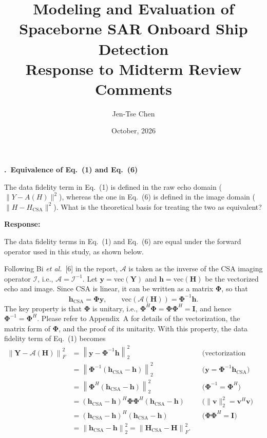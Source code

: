 \documentclass[12pt]{article}
\title{Modeling and Evaluation of Spaceborne SAR Onboard Ship Detection\\
       Response to Midterm Review Comments}
\author{Jen-Tse Chen}
\date{October, 2026}
\newcounter{comment}
\newcommand{\comment}[2]{%
  \refstepcounter{comment}%
  \par\bigskip\noindent\textbf{\thecomment.\ #1}\par\smallskip
  \noindent #2\par\medskip
}
\newcommand{\response}{\par\noindent\textbf{Response:}\par}
\begin{document}
\maketitle

\comment{Equivalence of Eq.~(1) and Eq.~(6)}{%
  The data fidelity term in Eq.~(1) is
  defined in the raw echo domain ($\|Y - A(H)\|^2$), whereas the one in
  Eq.~(6) is defined in the image domain ($\|H - H_{\mathrm{CSA}}\|^2$).
  What is the theoretical basis for treating the two as equivalent?}

\response
The data fidelity terms in Eq.~(1) and Eq.~(6) are equal under the forward
operator used in this study, as shown below.

Following Bi \textit{et al.}~[6] in the report, $\mathcal{A}$ is taken as the
inverse of the CSA imaging operator $\mathcal{I}$, i.e., $\mathcal{A} =
\mathcal{I}^{-1}$. Let $\mathbf{y} = \mathrm{vec}(\mathbf{Y})$ and $\mathbf{h}
= \mathrm{vec}(\mathbf{H})$ be the vectorized echo and image. Since CSA is
linear, it can be written as a matrix $\boldsymbol{\Phi}$, so that
\begin{equation*}
  \mathbf{h}_{\mathrm{CSA}} = \boldsymbol{\Phi}\mathbf{y}, \qquad
  \mathrm{vec}\left(\mathcal{A}(\mathbf{H})\right)
    = \boldsymbol{\Phi}^{-1}\mathbf{h}.
\end{equation*}
The key property is that $\boldsymbol{\Phi}$ is unitary, i.e.,
$\boldsymbol{\Phi}^{H}\boldsymbol{\Phi} = \boldsymbol{\Phi}\boldsymbol{\Phi}^{H}
= \mathbf{I}$, and hence $\boldsymbol{\Phi}^{-1} = \boldsymbol{\Phi}^{H}$. Please
refer to Appendix~A for details of the vectorization, the matrix form of
$\boldsymbol{\Phi}$, and the proof of its unitarity. With this property,
the data fidelity term of Eq.~(1) becomes
\begin{align*}
  \left\|\mathbf{Y} - \mathcal{A}(\mathbf{H})\right\|_F^2
    &= \left\|\mathbf{y} - \boldsymbol{\Phi}^{-1}\mathbf{h}\right\|_2^2
    && \text{(vectorization preserves the norm)} \\
    &= \left\|\boldsymbol{\Phi}^{-1}\left(\mathbf{h}_{\mathrm{CSA}}
         - \mathbf{h}\right)\right\|_2^2
    && \text{(}\mathbf{y} = \boldsymbol{\Phi}^{-1}\mathbf{h}_{\mathrm{CSA}}\text{)} \\
    &= \left\|\boldsymbol{\Phi}^{H}\left(\mathbf{h}_{\mathrm{CSA}}
         - \mathbf{h}\right)\right\|_2^2
    && \text{(}\boldsymbol{\Phi}^{-1} = \boldsymbol{\Phi}^{H}\text{)} \\
    &= \left(\mathbf{h}_{\mathrm{CSA}} - \mathbf{h}\right)^{H}
       \boldsymbol{\Phi}\boldsymbol{\Phi}^{H}
       \left(\mathbf{h}_{\mathrm{CSA}} - \mathbf{h}\right)
    && \text{(}\|\mathbf{v}\|_2^2 = \mathbf{v}^{H}\mathbf{v}\text{)} \\
    &= \left(\mathbf{h}_{\mathrm{CSA}} - \mathbf{h}\right)^{H}
       \left(\mathbf{h}_{\mathrm{CSA}} - \mathbf{h}\right)
    && \text{(}\boldsymbol{\Phi}\boldsymbol{\Phi}^{H} = \mathbf{I}\text{)} \\
    &= \left\|\mathbf{h}_{\mathrm{CSA}} - \mathbf{h}\right\|_2^2
     = \left\|\mathbf{H}_{\mathrm{CSA}} - \mathbf{H}\right\|_F^2 .
\end{align*}
\end{document}
